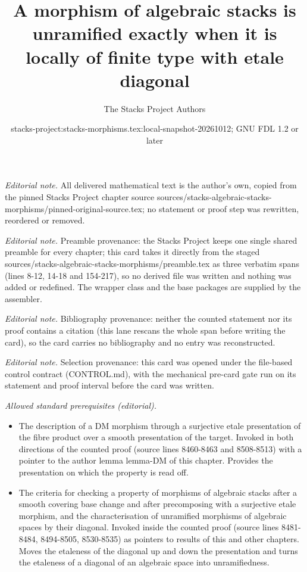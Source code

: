 \documentclass[10pt,a4paper]{amsart}
\title{A morphism of algebraic stacks is unramified exactly when it is locally of finite type with etale diagonal}
\author{The Stacks Project Authors}
\date{stacks-project:stacks-morphisms.tex:local-snapshot-20261012; GNU FDL 1.2 or later}
\theoremstyle{plain}
\theoremstyle{definition}
\theoremstyle{remark}
\numberwithin{equation}{subsection}
\begin{document}
\maketitle
\noindent\textit{Editorial note.} All delivered mathematical text is the author's own, copied from the pinned Stacks Project chapter source sources/stacks-algebraic-stacks-morphisms/pinned-original-source.tex; no statement or proof step was rewritten, reordered or removed.\par\medskip
\noindent\textit{Editorial note.} Preamble provenance: the Stacks Project keeps one single shared preamble for every chapter; this card takes it directly from the staged sources/stacks-algebraic-stacks-morphisms/preamble.tex as three verbatim spans (lines 8-12, 14-18 and 154-217), so no derived file was written and nothing was added or redefined. The wrapper class and the base packages are supplied by the assembler.\par\medskip
\noindent\textit{Editorial note.} Bibliography provenance: neither the counted statement nor its proof contains a citation (this lane rescans the whole span before writing the card), so the card carries no bibliography and no entry was reconstructed.\par\medskip
\noindent\textit{Editorial note.} Selection provenance: this card was opened under the file-based control contract (CONTROL.md), with the mechanical pre-card gate run on its statement and proof interval before the card was written.\par\medskip
\noindent\textit{Allowed standard prerequisites (editorial).}\begin{itemize}
\item The description of a DM morphism through a surjective etale presentation of the fibre product over a smooth presentation of the target. Invoked in both directions of the counted proof (source lines 8460-8463 and 8508-8513) with a pointer to the author lemma lemma-DM of this chapter. Provides the presentation on which the property is read off.
\item The criteria for checking a property of morphisms of algebraic stacks after a smooth covering base change and after precomposing with a surjective etale morphism, and the characterisation of unramified morphisms of algebraic spaces by their diagonal. Invoked inside the counted proof (source lines 8481-8484, 8494-8505, 8530-8535) as pointers to results of this and other chapters. Moves the etaleness of the diagonal up and down the presentation and turns the etaleness of a diagonal of an algebraic space into unramifiedness.
\end{itemize}\medskip
\end{document}
